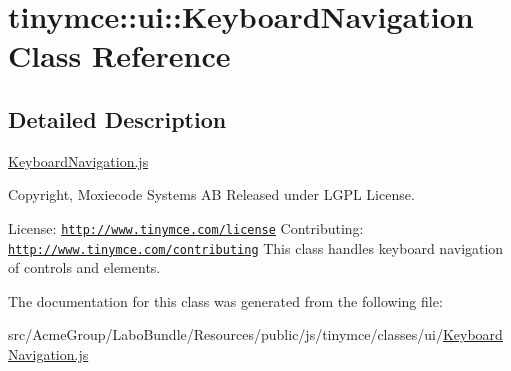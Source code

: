 \hypertarget{classtinymce_1_1ui_1_1_keyboard_navigation}{\section{tinymce\+:\+:ui\+:\+:Keyboard\+Navigation Class Reference}
\label{classtinymce_1_1ui_1_1_keyboard_navigation}
}


\subsection{Detailed Description}
\hyperlink{_keyboard_navigation_8js}{Keyboard\+Navigation.\+js}

Copyright, Moxiecode Systems A\+B Released under L\+G\+P\+L License.

License\+: \href{http://www.tinymce.com/license}{\tt http\+://www.\+tinymce.\+com/license} Contributing\+: \href{http://www.tinymce.com/contributing}{\tt http\+://www.\+tinymce.\+com/contributing} This class handles keyboard navigation of controls and elements. 

The documentation for this class was generated from the following file\+:\begin{DoxyCompactItemize}
\item 
src/\+Acme\+Group/\+Labo\+Bundle/\+Resources/public/js/tinymce/classes/ui/\hyperlink{_keyboard_navigation_8js}{Keyboard\+Navigation.\+js}\end{DoxyCompactItemize}
